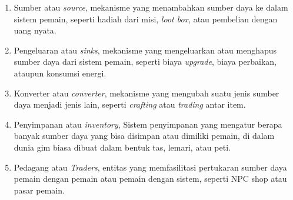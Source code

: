 \begin{enumerate}
    \item Sumber atau \textit{source}, mekanisme yang menambahkan sumber daya ke dalam sistem pemain, seperti hadiah dari misi, \textit{loot box}, atau pembelian dengan uang nyata.
    
    \item Pengeluaran atau \textit{sinks}, mekanisme yang mengeluarkan atau menghapus sumber daya dari sistem pemain, seperti biaya \textit{upgrade}, biaya perbaikan, ataupun konsumsi energi.
    
    \item Konverter atau \textit{converter}, mekanisme yang mengubah suatu jenis sumber daya menjadi jenis lain, seperti \textit{crafting} atau \textit{trading} antar item.
    
    \item Penyimpanan atau \textit{inventory}, Sistem penyimpanan yang mengatur berapa banyak sumber daya yang bisa disimpan atau dimiliki pemain, di dalam dunia gim biasa dibuat dalam bentuk tas, lemari, atau peti.
    
    \item Pedagang atau \textit{Traders}, entitas yang memfasilitasi pertukaran sumber daya pemain dengan pemain atau pemain dengan sistem, seperti NPC shop atau pasar pemain.
    
\end{enumerate}

